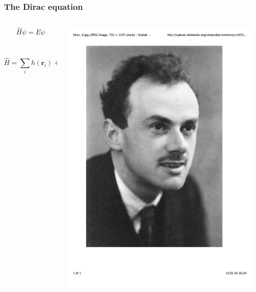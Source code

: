 \documentclass[mathserif,10pt]{beamer}
\begin{document}
\begin{frame}
    \frametitle{The Dirac equation}
    \begin{columns}
    \begin{column}{.50\textwidth}
	\begin{equation}
	    \nonumber
	    \hat{H} \psi = E \psi
	\end{equation}
	\ \\
	\ \\
	\begin{equation}
	    \nonumber
	    \hat{H} = \sum_i h(\boldsymbol{r}_i) + \frac{1}{2}\sum_{i,j} g(\boldsymbol{r}_i,\boldsymbol{r}_j)
	\end{equation}
    \end{column}
    \begin{column}{.50\textwidth}
	\centering
	\includegraphics[viewport = 50 200 500 800, clip, scale=0.15]{figures/dirac.pdf}

\end{column}
\end{columns}
\end{frame}
\end{document}

